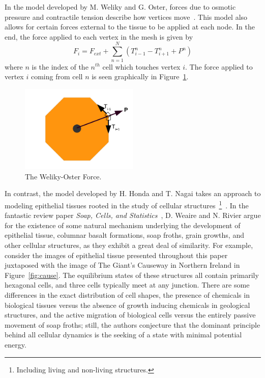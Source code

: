 In the model developed by M. Weliky and G. Oster, forces due to osmotic pressure and contractile tension describe how vertices move~\cite{WO}. This model also allows for certain forces external to the tissue to be applied at each node. In the end, the force applied to each vertex in the mesh is given by
\begin{equation*}
F_i = F_{ext}+\sum\limits_{n=1}^N(T_{i-1}^n - T_{i+1}^n + P^n)
\end{equation*}
where $n$ is the index of the $n^{th}$ cell which touches vertex $i$. The force applied to vertex $i$ coming from cell $n$  is seen graphically in Figure~\ref{fig:WO}.
\begin{figure}[ht]
\centering
\includegraphics[width=0.5\textwidth]{../diagrams/welikyoster.png}
\caption{The Weliky-Oster Force.}
\label{fig:WO}
\end{figure}

In contrast, the model developed by H. Honda and T. Nagai takes an approach to modeling epithelial tissues rooted in the study of cellular structures~\footnote{Including living and non-living structures.}~\cite{VertDyn}.  In the fantastic review paper \emph{Soap, Cells, and Statistics}~\cite{Soap}, D. Weaire and N. Rivier argue for the existence of some natural mechanism underlying the development of epithelial tissue, columnar basalt formations, soap froths, grain growths, and other cellular structures, as they exhibit a great deal of similarity. For example, consider the images of epithelial tissue presented throughout this paper juxtaposed with the image of The Giant's Causeway in Northern Ireland in Figure~\ref{fig:cause}. The equilibrium states of these structures all contain primarily hexagonal cells, and three cells typically meet at any junction. There are some differences in the exact distribution of cell shapes, the presence of chemicals in biological tissues versus the absence of growth inducing chemicals in geological structures, and the active migration of biological cells versus the entirely passive movement of soap froths; still, the authors conjecture that the dominant principle behind all cellular dynamics is the seeking of a state with minimal potential energy.

